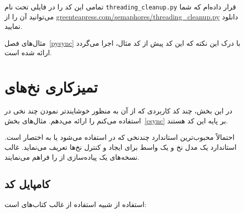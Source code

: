 \documentclass{book}
\begin{document}
    تمامی این کد را در فایلی تحت نام {\tt threading\_cleanup.py} قرار داده‌ام که شما می‌توانید آن را از 
    \url{greenteapress.com/semaphores/threading\_cleanup.py} دانلود نمایید. 


    مثال‌های فصل~\ref{pysync} با درک این نکته که این کد پیش از کد مثال، اجرا می‌گردد ارائه شده است. 


\chapter{تمیزکاری نخ‌های  }
\label{ccleanup}

    در این بخش، چند کد کاربردی که از آن‌ به منظور خوشایندتر نمودن چند نخی در  استفاده می‌کنم را ارائه می‌دهم. 
    مثال‌های بخش~\ref{csync} بر پایه این کد هستند. 

    احتمالاً محبوب‌ترین استاندارد چندنخی که در   استفاده می‌شود  یا به اختصار  است. 
    استاندارد   یک مدل نخ و یک واسط برای ایجاد و کنترل نخ‌ها تعریف می‌نماید. 
    غالب نسخه‌های   یک پیاده‌سازی از  را فراهم می‌نمایند. 

\section{کامپایل کد  }

    استفاده از    شبیه استفاده از غالب کتاب‌های   است: 
\end{document}

